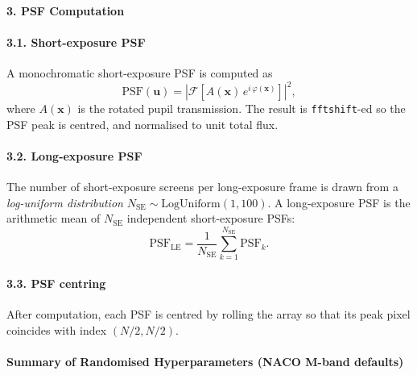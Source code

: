 \documentclass{aa}
\begin{document}
\paragraph{3. PSF Computation}

\paragraph{3.1. Short-exposure PSF}

A monochromatic short-exposure PSF is computed as
\begin{equation}
\mathrm{PSF}(\mathbf{u}) = \left| \mathcal{F}\!\left[ A(\mathbf{x})\, e^{i\,\varphi(\mathbf{x})} \right] \right|^2,
\end{equation}
where $A(\mathbf{x})$ is the rotated pupil transmission. The result is \texttt{fftshift}-ed so the PSF peak is centred, and normalised to unit total flux.

\paragraph{3.2. Long-exposure PSF}

The number of short-exposure screens per long-exposure frame is drawn from a \emph{log-uniform distribution} $N_\mathrm{SE} \sim \mathrm{LogUniform}(1, 100)$. A long-exposure PSF is the arithmetic mean of $N_\mathrm{SE}$ independent short-exposure PSFs:
\begin{equation}
\mathrm{PSF}_\mathrm{LE} = \frac{1}{N_\mathrm{SE}} \sum_{k=1}^{N_\mathrm{SE}} \mathrm{PSF}_k.
\end{equation}

\paragraph{3.3. PSF centring}

After computation, each PSF is centred by rolling the array so that its peak pixel coincides with index $(N/2, N/2)$.

\paragraph{Summary of Randomised Hyperparameters (NACO M-band defaults)}
\end{document}
